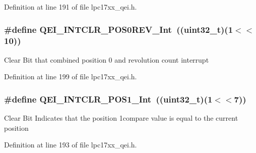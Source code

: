 \-Definition at line 191 of file lpc17xx\-\_\-qei.\-h.

\hypertarget{group___q_e_i___private___macros_ga948a9c6847436f3a985b41d0dfbca679}{
\subsubsection[{\-Q\-E\-I\-\_\-\-I\-N\-T\-C\-L\-R\-\_\-\-P\-O\-S0\-R\-E\-V\-\_\-\-Int}]{\setlength{\rightskip}{0pt plus 5cm}\#define {\bf \-Q\-E\-I\-\_\-\-I\-N\-T\-C\-L\-R\-\_\-\-P\-O\-S0\-R\-E\-V\-\_\-\-Int}~((uint32\-\_\-t)(1$<$$<$10))}}\label{group___q_e_i___private___macros_ga948a9c6847436f3a985b41d0dfbca679}
\-Clear \-Bit that combined position 0 and revolution count interrupt 

\-Definition at line 199 of file lpc17xx\-\_\-qei.\-h.

\hypertarget{group___q_e_i___private___macros_ga5d064afd2653ec2bba4684a4640c2e9f}{
\subsubsection[{\-Q\-E\-I\-\_\-\-I\-N\-T\-C\-L\-R\-\_\-\-P\-O\-S1\-\_\-\-Int}]{\setlength{\rightskip}{0pt plus 5cm}\#define {\bf \-Q\-E\-I\-\_\-\-I\-N\-T\-C\-L\-R\-\_\-\-P\-O\-S1\-\_\-\-Int}~((uint32\-\_\-t)(1$<$$<$7))}}\label{group___q_e_i___private___macros_ga5d064afd2653ec2bba4684a4640c2e9f}
\-Clear \-Bit \-Indicates that the position 1compare value is equal to the current position 

\-Definition at line 193 of file lpc17xx\-\_\-qei.\-h.

